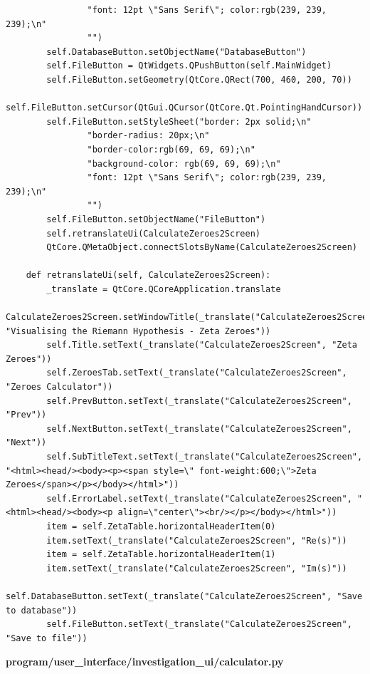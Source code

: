 \documentclass{article}
\begin{document}
\begin{lstlisting}
                "font: 12pt \"Sans Serif\"; color:rgb(239, 239, 239);\n"
                "")
        self.DatabaseButton.setObjectName("DatabaseButton")
        self.FileButton = QtWidgets.QPushButton(self.MainWidget)
        self.FileButton.setGeometry(QtCore.QRect(700, 460, 200, 70))
        self.FileButton.setCursor(QtGui.QCursor(QtCore.Qt.PointingHandCursor))
        self.FileButton.setStyleSheet("border: 2px solid;\n"
                "border-radius: 20px;\n"
                "border-color:rgb(69, 69, 69);\n"
                "background-color: rgb(69, 69, 69);\n"
                "font: 12pt \"Sans Serif\"; color:rgb(239, 239, 239);\n"
                "")
        self.FileButton.setObjectName("FileButton")
        self.retranslateUi(CalculateZeroes2Screen)
        QtCore.QMetaObject.connectSlotsByName(CalculateZeroes2Screen)

    def retranslateUi(self, CalculateZeroes2Screen):
        _translate = QtCore.QCoreApplication.translate
        CalculateZeroes2Screen.setWindowTitle(_translate("CalculateZeroes2Screen", "Visualising the Riemann Hypothesis - Zeta Zeroes"))
        self.Title.setText(_translate("CalculateZeroes2Screen", "Zeta Zeroes"))
        self.ZeroesTab.setText(_translate("CalculateZeroes2Screen", "Zeroes Calculator"))
        self.PrevButton.setText(_translate("CalculateZeroes2Screen", "Prev"))
        self.NextButton.setText(_translate("CalculateZeroes2Screen", "Next"))
        self.SubTitleText.setText(_translate("CalculateZeroes2Screen", "<html><head/><body><p><span style=\" font-weight:600;\">Zeta Zeroes</span></p></body></html>"))
        self.ErrorLabel.setText(_translate("CalculateZeroes2Screen", "<html><head/><body><p align=\"center\"><br/></p></body></html>"))
        item = self.ZetaTable.horizontalHeaderItem(0)
        item.setText(_translate("CalculateZeroes2Screen", "Re(s)"))
        item = self.ZetaTable.horizontalHeaderItem(1)
        item.setText(_translate("CalculateZeroes2Screen", "Im(s)"))
        self.DatabaseButton.setText(_translate("CalculateZeroes2Screen", "Save to database"))
        self.FileButton.setText(_translate("CalculateZeroes2Screen", "Save to file"))
\end{lstlisting}


\textbf{program/user\_interface/investigation\_ui/calculator.py}
\end{document}
